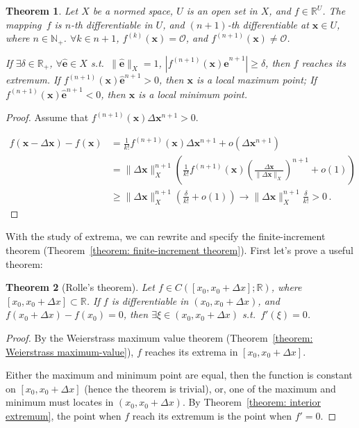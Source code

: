 \documentclass[openany]{book}
\theoremstyle{plain}
\newtheorem{theorem}{Theorem}[section] %
\theoremstyle{definition}
\newcommand*{\basis}[1]{\hat{\boldsymbol{#1}}} %
\newcommand*{\bv}{\boldsymbol} %
\begin{document}
\begin{theorem}
	Let $X$ be a normed space, $U$ is an open set in $X$, and $f \in \mathbb R^U$.
	The mapping~$f$ is $n$-th differentiable in $U$, and $(n + 1)$-th differentiable at $\bv x \in U$, where $n \in \mathbb N_+$.
	$\forall k \in n + 1$, $f^{(k)}(\bv x) = \mathscr O$, and $f^{(n + 1)}(\bv x) \neq \mathscr O$.

	If $\exists \delta \in \mathbb R_+$, $\forall \basis e \in X$ s.t.\ $\|\basis e\|_X = 1$, $|f^{(n + 1)}(\bv x) \basis e^{n+1}| \geq \delta$, then $f$ reaches its extremum.
	If $f^{(n + 1)}(\bv x) \basis e^{n+1} > 0$, then $\bv x$ is a local maximum point; 
	If $f^{(n + 1)}(\bv x) \basis e^{n+1} < 0$, then $\bv x$ is a local minimum point. 
\end{theorem}
\begin{proof}
	Assume that $f^{(n + 1)}(\bv x) \Delta \bv x^{n+1} > 0$.
	
	\begin{align*}
		f(\bv x - \Delta \bv x) - f(\bv x)
		&= \frac{1}{k!} f^{(n + 1)}(\bv x) \Delta \bv x^{n+1} + o(\Delta \bv x^{n+1})
		\\
		&= \|\Delta \bv x\|_X^{n+1} \left( 
			\frac{1}{k!} f^{(n + 1)}(\bv x) \left(\frac{\Delta \bv x}{\|\Delta \bv x\|_X}\right)^{n+1} + o(1)
		 \right)
		\\
		&\geq
		\|\Delta \bv x\|_X^{n+1} \left( 
			\frac{\delta}{k!}  + o(1)
		 \right) \to \|\Delta \bv x\|_X^{n+1} \frac{\delta}{k!} > 0\,.
	\end{align*}	
\end{proof}

With the study of extrema, we can rewrite and specify the finite-increment theorem (Theorem~\ref{theorem: finite-increment theorem}). 
First let's prove a useful theorem:

\begin{theorem}[Rolle's theorem]
	\label{theorem: Rolle}
	Let $f \in C([x_0, x_0 + \Delta x]; \mathbb R)$, where $[x_0, x_0 + \Delta x] \subset \mathbb R$. 
	If $f$ is differentiable in $(x_0, x_0 + \Delta x)$, and $f(x_0 + \Delta x) - f(x_0) = 0$, then $\exists \xi \in (x_0, x_0 + \Delta x)$ s.t.\ $f'(\xi) = 0$.
\end{theorem}
\begin{proof}
	By the Weierstrass maximum value theorem (Theorem~\ref{theorem: Weierstrass maximum-value}), $f$ reaches its extrema in $[x_0, x_0 + \Delta x]$.
	
	Either the maximum and minimum point are equal, then the function is constant on $[x_0, x_0 + \Delta x]$ (hence the theorem is trivial), or, one of the maximum and minimum must locates in $(x_0, x_0 + \Delta x)$. 
	By Theorem~\ref{theorem: interior extremum}, the point when $f$ reach its extremum is the point when $f' = 0$.
\end{proof}
\end{document}
